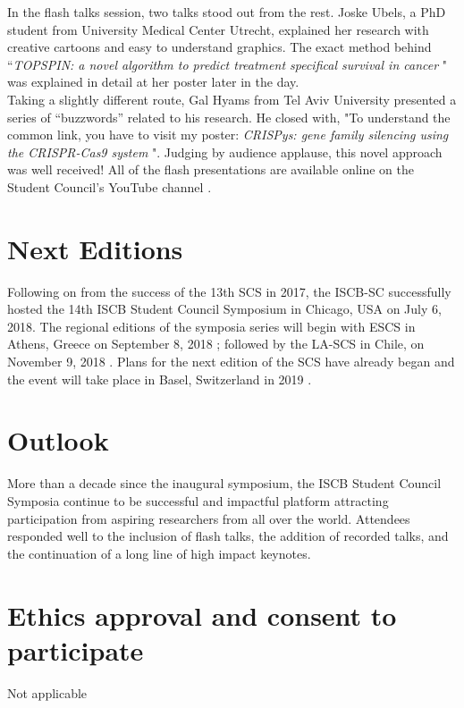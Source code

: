 \documentclass[]{article}%
\begin{document}
	In the flash talks session, two talks stood out from the rest. Joske Ubels, a PhD student from University Medical Center Utrecht, explained her research with creative cartoons and easy to understand graphics. The exact method behind “\textit{TOPSPIN: a novel algorithm to predict treatment specifical survival in cancer} \citep{ ubels2017}" was explained in detail at her poster later in the day.\\
	
	Taking a slightly different route, Gal Hyams from Tel Aviv University presented a series of “buzzwords” related to his research. He closed with, "To understand the common link, you have to visit my poster: \textit{CRISPys: gene family silencing using the CRISPR-Cas9 system} \citep{gal2017youtube}". Judging by audience applause, this novel approach was well received! All of the flash presentations are available online on the Student Council’s YouTube channel \citep{flashtalks2017youtube}.\\
	
	
	\section*{Next Editions}
	
	Following on from the success of the 13th SCS in 2017, the ISCB-SC successfully hosted the 14th ISCB Student Council Symposium in Chicago, USA \citep{2018symposiumsite} on July 6, 2018. The regional editions of the symposia series will begin with ESCS in Athens, Greece on September 8, 2018 \citep{escs}; followed by the LA-SCS in Chile, on November 9, 2018 \citep{lascs}. Plans for the next edition of the SCS have already began and the event will take place in Basel, Switzerland in 2019 \citep{symposiumsite}.
	
	\section*{Outlook}
	More than a decade since the inaugural symposium, the ISCB Student Council Symposia continue to be successful and impactful platform attracting participation from aspiring researchers from all over the world. Attendees responded well to the inclusion of flash talks, the addition of recorded talks, and the continuation of a long line of high impact keynotes. 
	
	\section*{Ethics approval and consent to participate}
	Not applicable
	
\end{document}

